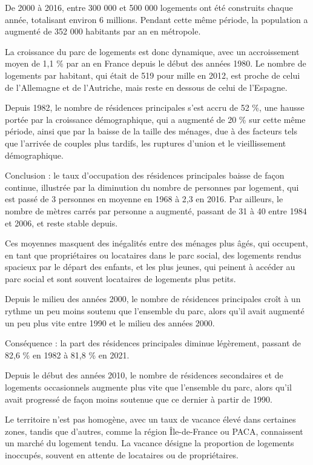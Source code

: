 \documentclass[a4paper, 12pt]{report}
\begin{document}
De 2000 à 2016, entre 300 000 et 500 000 logements ont été construits chaque année, totalisant environ 6 millions. Pendant cette même période, la population a augmenté de 352 000 habitants par an en métropole.

La croissance du parc de logements est donc dynamique, avec un accroissement moyen de 1,1 \% par an en France depuis le début des années 1980. Le nombre de logements par habitant, qui était de 519 pour mille en 2012, est proche de celui de l’Allemagne et de l’Autriche, mais reste en dessous de celui de l’Espagne.

Depuis 1982, le nombre de résidences principales s’est accru de 52 \%, une hausse portée par la croissance démographique, qui a augmenté de 20 \% sur cette même période, ainsi que par la baisse de la taille des ménages, due à des facteurs tels que l'arrivée de couples plus tardifs, les ruptures d’union et le vieillissement démographique.

Conclusion : le taux d’occupation des résidences principales baisse de façon continue, illustrée par la diminution du nombre de personnes par logement, qui est passé de 3 personnes en moyenne en 1968 à 2,3 en 2016. Par ailleurs, le nombre de mètres carrés par personne a augmenté, passant de 31 à 40 entre 1984 et 2006, et reste stable depuis.

Ces moyennes masquent des inégalités entre des ménages plus âgés, qui occupent, en tant que propriétaires ou locataires dans le parc social, des logements rendus spacieux par le départ des enfants, et les plus jeunes, qui peinent à accéder au parc social et sont souvent locataires de logements plus petits.

Depuis le milieu des années 2000, le nombre de résidences principales croît à un rythme un peu moins soutenu que l’ensemble du parc, alors qu'il avait augmenté un peu plus vite entre 1990 et le milieu des années 2000.

Conséquence : la part des résidences principales diminue légèrement, passant de 82,6 \% en 1982 à 81,8 \% en 2021.

Depuis le début des années 2010, le nombre de résidences secondaires et de logements occasionnels augmente plus vite que l’ensemble du parc, alors qu'il avait progressé de façon moins soutenue que ce dernier à partir de 1990.

Le territoire n’est pas homogène, avec un taux de vacance élevé dans certaines zones, tandis que d'autres, comme la région Île-de-France ou PACA, connaissent un marché du logement tendu. La vacance désigne la proportion de logements inoccupés, souvent en attente de locataires ou de propriétaires.
\end{document}
